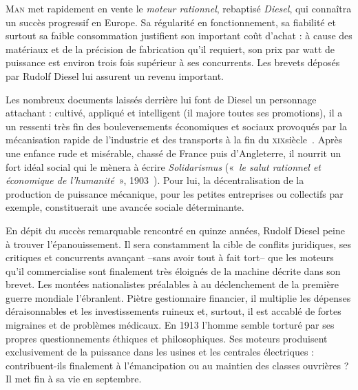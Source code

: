 	\textsc{Man} met rapidement en vente le \textit{moteur rationnel}, rebaptisé \textit{Diesel}, qui connaîtra un succès progressif en Europe. Sa régularité en fonctionnement, sa fiabilité et surtout sa faible consommation justifient son important coût d’achat : à cause des matériaux et de la précision de fabrication qu’il requiert, son prix par watt de puissance est environ trois fois supérieur à ses concurrents. Les brevets déposés par Rudolf Diesel lui assurent un revenu important.
	
	Les nombreux documents laissés derrière lui font de Diesel un personnage attachant : cultivé, appliqué et intelligent (il majore toutes ses promotions), il a un ressenti très fin des bouleversements économiques et sociaux provoqués par la mécanisation rapide de l’industrie et des transports à la fin du \textsc{xix}\ieme siècle~\cite{grosser1978,thomas1978,coltrane1997}. Après une enfance rude et misérable, chassé de France puis d’Angleterre, il nourrit un fort idéal social qui le mènera à écrire \textit{Solidarismus} («~\textit{le salut rationnel et économique de l’humanité}~», 1903~\cite{diesel1903}). Pour lui, la décentralisation de la production de puissance mécanique, pour les petites entreprises ou collectifs par exemple, constituerait une avancée sociale déterminante.
	
	En dépit du succès remarquable rencontré en quinze années, Rudolf Diesel peine à trouver l’épanouissement. Il sera constamment la cible de conflits juridiques, ses critiques et concurrents avançant --sans avoir tout à fait tort-- que les moteurs qu’il commercialise sont finalement très éloignés de la machine décrite dans son brevet. Les montées nationalistes préalables à au déclenchement de la première guerre mondiale l’ébranlent. Piètre gestionnaire financier, il multiplie les dépenses déraisonnables et les investissements ruineux et, surtout, il est accablé de fortes migraines et de problèmes médicaux. En 1913 l’homme semble torturé par ses propres questionnements éthiques et philosophiques. Ses moteurs produisent exclusivement de la puissance dans les usines et les centrales électriques : contribuent-ils finalement à l’émancipation ou au maintien des classes ouvrières ? Il met fin à sa vie en septembre.
	
